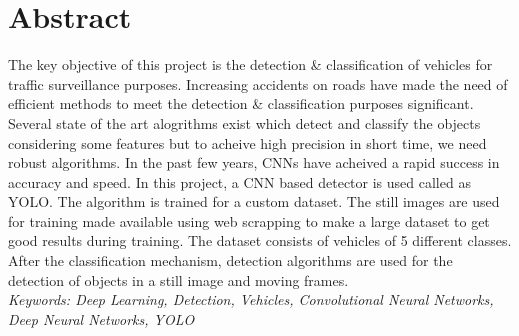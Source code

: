 
\chapter*{Abstract}
\vspace{-3mm}
The key objective of this project is the detection \& classification of vehicles for traffic surveillance purposes.
Increasing accidents on roads have made the need of efficient methods to meet the detection \& classification
purposes significant. Several state of the art alogrithms exist which detect and classify the objects considering
some features but to acheive high precision in short time, we need robust algorithms. In the past few years, CNNs have
acheived a rapid success in accuracy and speed. In this project, a CNN based detector is used called as YOLO. The algorithm is
trained for a custom dataset. The still images are used for training made available using web scrapping to make a large dataset
to get good results during training. The dataset consists of vehicles of 5 different classes. After the classification 
mechanism, detection algorithms are used for the detection of objects in a still image 
and moving frames. 
\vspace{15mm}\ \\
\textit{Keywords: Deep Learning, Detection, Vehicles, Convolutional Neural Networks, Deep Neural Networks, YOLO}
